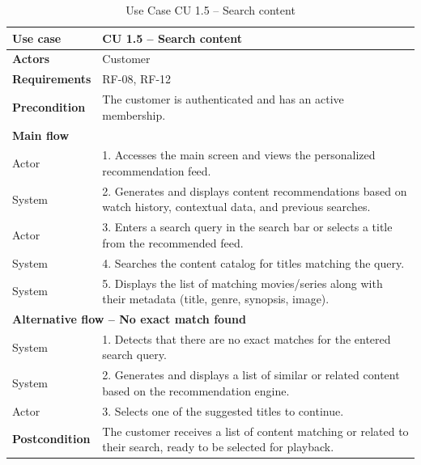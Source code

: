 \documentclass{article}
\begin{document}
\begin{table}[H]
\centering
\small
\renewcommand{\arraystretch}{1.35}
\caption{Use Case CU 1.5 -- Search content}
\label{tab:cu1.5}
\begin{tabularx}{\textwidth}{|l|X|}
\hline
\textbf{Use case} & CU 1.5 -- Search content \\ \hline
\textbf{Actors} & Customer \\ \hline
\textbf{Requirements} & RF-08, RF-12 \\ \hline
\textbf{Precondition} & The customer is authenticated and has an active membership. \\ \hline
\multicolumn{2}{|l|}{\textbf{Main flow}} \\ \hline
Actor & 1. Accesses the main screen and views the personalized recommendation feed. \\ \hline
System & 2. Generates and displays content recommendations based on watch history, contextual data, and previous searches. \\ \hline
Actor & 3. Enters a search query in the search bar or selects a title from the recommended feed. \\ \hline
System & 4. Searches the content catalog for titles matching the query. \\ \hline
System & 5. Displays the list of matching movies/series along with their metadata (title, genre, synopsis, image). \\ \hline
\multicolumn{2}{|l|}{\textbf{Alternative flow -- No exact match found}} \\ \hline
System & 1. Detects that there are no exact matches for the entered search query. \\ \hline
System & 2. Generates and displays a list of similar or related content based on the recommendation engine. \\ \hline
Actor & 3. Selects one of the suggested titles to continue. \\ \hline
\textbf{Postcondition} & The customer receives a list of content matching or related to their search, ready to be selected for playback. \\ \hline
\end{tabularx}
\end{table}
\end{document}
